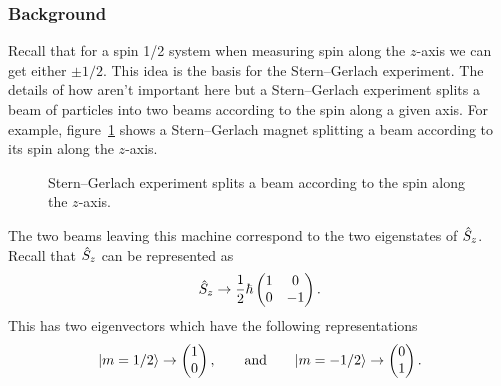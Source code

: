     \subsubsection{Background}
    Recall that for a spin 1/2 system when measuring spin along the \(z\)-axis we can get either \(\pm 1/2\).
    This idea is the basis for the Stern--Gerlach experiment.
    The details of how aren't important here but a Stern--Gerlach experiment splits a beam of particles into two beams according to the spin along a given axis.
    For example, figure~\ref{fig:stern-gerlach z} shows a Stern--Gerlach magnet splitting a beam according to its spin along the \(z\)-axis.
    \begin{figure}[ht]
        \centering
        \caption{Stern--Gerlach experiment splits a beam according to the spin along the \(z\)-axis.}
        \label{fig:stern-gerlach z}
    \end{figure}
    The two beams leaving this machine correspond to the two eigenstates of \(\hat{S}_z\).
    Recall that \(\hat{S}_z\) can be represented as
    \[
        \hat{S}_z \mathrel{\rightarrow} \frac{1}{2}\hbar
        \begin{pmatrix}
            1 & 0\\
            0 & -1
        \end{pmatrix}
        .
    \]
    This has two eigenvectors which have the following representations
    \[
        \vert {m = 1/2} \rangle \mathrel{\rightarrow} 
        \begin{pmatrix}
            1 \\ 0
        \end{pmatrix}
        , \qquad\text{and}\qquad \vert {m = -1/2} \rangle \mathrel{\rightarrow} 
        \begin{pmatrix}
            0 \\ 1
        \end{pmatrix}
        .
    \]
